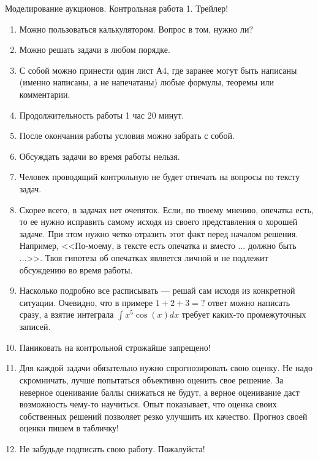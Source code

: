 \documentclass[pdftex,12pt,a4paper]{article}
\begin{document}


\begin{Large}
Моделирование аукционов. Контрольная работа 1. Трейлер!
\end{Large}

\begin{enumerate}
\item Можно пользоваться калькулятором. Вопрос в том, нужно ли?
\item Можно решать задачи в любом порядке.
\item С собой можно принести один лист А4, где заранее могут быть написаны (именно написаны, а не напечатаны) любые формулы, теоремы или комментарии.
\item Продолжительность работы 1 час 20 минут.
\item После окончания работы условия можно забрать с собой.
\item Обсуждать задачи во время работы нельзя.
\item Человек проводящий контрольную не будет отвечать на вопросы по тексту задач. 
\item Скорее всего, в задачах нет очепяток. Если, по твоему мнению, опечатка есть, то ее нужно исправить самому исходя из своего представления о хорошей задаче. При этом нужно четко отразить этот факт перед началом решения. Например, <<По-моему, в тексте есть опечатка и вместо ... должно быть ...>>. Твоя гипотеза об опечатках является личной и не подлежит обсуждению во время работы.
\item Насколько подробно все расписывать --- решай сам исходя из конкретной ситуации. Очевидно, что в примере $ 1+2+3=? $ ответ можно написать сразу, а взятие интеграла $ \int x^{5}\cos(x)dx $ требует каких-то промежуточных записей.
\item Паниковать на контрольной строжайше запрещено!
\item Для каждой задачи обязательно нужно спрогнозировать свою оценку. Не надо скромничать, лучше попытаться объективно оценить свое решение.  За неверное оценивание баллы снижаться не будут, а верное оценивание даст возможность чему-то научиться. Опыт показывает, что оценка своих собственных решений позволяет резко улучшить их качество. Прогноз своей оценки пишем в табличку!
\item Не забудьде подписать свою работу. Пожалуйста!

\end{enumerate}
\end{document}
